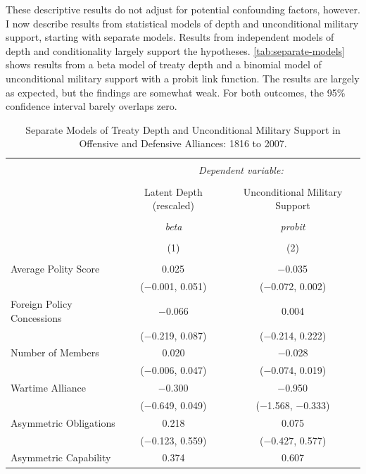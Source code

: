 \documentclass[12pt]{article}
\begin{document}
These descriptive results do not adjust for potential confounding factors, however.
I now describe results from statistical models of depth and unconditional military support, starting with separate models. 
Results from independent models of depth and conditionality largely support the hypotheses. 
\autoref{tab:separate-models} shows results from a beta model of treaty depth and a binomial model of unconditional military support with a probit link function. 
The results are largely as expected, but the findings are somewhat weak.
For both outcomes, the 95\% confidence interval barely overlaps zero.  


\begin{table}[!htbp] \centering 
  \caption{Separate Models of Treaty Depth and Unconditional Military Support in Offensive and Defensive Alliances: 1816 to 2007.} 
  \label{tab:separate-models} 
\begin{tabular}{@{\extracolsep{5pt}}lcc} 
\\[-1.8ex]\hline 
\hline \\[-1.8ex] 
 & \multicolumn{2}{c}{\textit{Dependent variable:}} \\ 
\cline{2-3} 
\\[-1.8ex] & Latent Depth (rescaled) & Unconditional Military Support \\ 
\\[-1.8ex] & \textit{beta} & \textit{probit} \\ 
\\[-1.8ex] & (1) & (2)\\ 
\hline \\[-1.8ex] 
 Average Polity Score & 0.025$^{}$ & $-$0.035$^{}$ \\ 
  & ($-$0.001, 0.051) & ($-$0.072, 0.002) \\ 
  Foreign Policy Concessions & $-$0.066 & 0.004 \\ 
  & ($-$0.219, 0.087) & ($-$0.214, 0.222) \\ 
  Number of Members & 0.020 & $-$0.028 \\ 
  & ($-$0.006, 0.047) & ($-$0.074, 0.019) \\ 
  Wartime Alliance & $-$0.300$^{}$ & $-$0.950$^{}$ \\ 
  & ($-$0.649, 0.049) & ($-$1.568, $-$0.333) \\ 
  Asymmetric Obligations & 0.218 & 0.075 \\ 
  & ($-$0.123, 0.559) & ($-$0.427, 0.577) \\ 
  Asymmetric Capability & 0.374 & 0.607 \\ 

\end{tabular}
\end{table}
\end{document}
